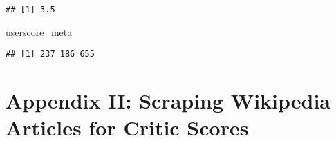 \documentclass[
  11pt,
]{article}
\newenvironment{Shaded}{\begin{snugshade}}{\end{snugshade}}
\newcommand{\NormalTok}[1]{#1}
\begin{document}
\begin{verbatim}
## [1] 3.5
\end{verbatim}

\begin{Shaded}
\begin{Highlighting}[]
\NormalTok{userscore\_meta}
\end{Highlighting}
\end{Shaded}

\begin{verbatim}
## [1] 237 186 655
\end{verbatim}

\newpage

\hypertarget{appendix-ii-scraping-wikipedia-articles-for-critic-scores}{%
\section{Appendix II: Scraping Wikipedia Articles for Critic
Scores}\label{appendix-ii-scraping-wikipedia-articles-for-critic-scores}}
\end{document}
